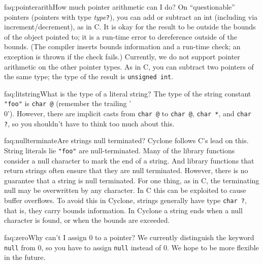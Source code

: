 \begin{faqa}{faq:pointerarith}{How much pointer arithmetic can I do?}
On ``questionable'' pointers (pointers with type
\textit{type}\texttt{?}), you can add or subtract an int (including
via increment/decrement), as in C\@.  It is okay for the result to be
outside the bounds of the object pointed to; it is a run-time error to
dereference outside of the bounds.  (The compiler inserts bounds
information and a run-time check; an exception is thrown if the check
fails.)  Currently, we do not support pointer arithmetic on the other
pointer types.  As in C, you can subtract two pointers of the same
type; the type of the result is \texttt{unsigned int}.
\end{faqa}

\begin{faqa}{faq:litstring}{What is the type of a literal string?}
The type of the string constant \texttt{"foo"} is \texttt{char @\rb} (remember the trailing '\\0').  However, there are implicit
casts from \texttt{char @\rb} to \texttt{char @\rb},
\texttt{char *\rb}, and \texttt{char ?}, so you shouldn't have to
think too much about this.
\end{faqa}

\begin{faqa}{faq:nullterminate}{Are strings null terminated?}
Cyclone follows C's lead on this.  String literals lie \texttt{"foo"}
are null-terminated.  Many of the library functions consider a null
character to mark the end of a string.  And library functions that
return strings often ensure that they are null terminated.  However,
there is no guarantee that a string is null terminated.  For one
thing, as in C, the terminating null may be overwritten by any
character.  In C this can be exploited to cause buffer overflows.  To
avoid this in Cyclone, strings generally have type \texttt{char ?},
that is, they carry bounds information.  In Cyclone a string ends when
a null character is found, or when the bounds are exceeded.
\end{faqa}

\begin{faqa}{faq:zero}{Why can't I assign 0 to a pointer?}
We currently distinguish the keyword \texttt{null} from 0, so you have
to assign \texttt{null} instead of 0.  We hope to be more flexible in
the future.
\end{faqa}

